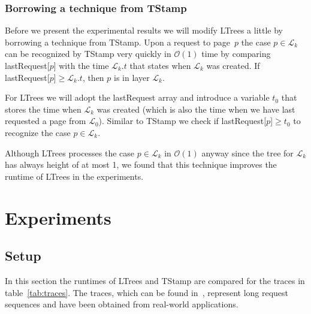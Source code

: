 \documentclass[a4paper,12pt, titlepage]{article}  %
\newcommand{\cl}{\mathcal{L}}   %
\newcommand{\oh}{\mathcal{O}}   %
\begin{document}
\subsubsection{Borrowing a technique from TStamp}
Before we present the experimental results we will modify LTrees a little by borrowing a technique
from TStamp. Upon a request to page~$p$ the case $p \in \cl_k$ can be recognized by TStamp very quickly in $\oh(1)$ time by
comparing lastRequest[$p$] with the time $\cl_k.t$ that states when 
$\cl_k$ was created. If lastRequest[$p$]$\geq \cl_k.t$, then $p$ is in layer $\cl_k$.

For LTrees we will adopt the lastRequest array and introduce a variable $t_0$ that stores 
the time when $\cl_k$ was created (which is also the time when we have last requested a page from $\cl_0$). 
Similar to TStamp we check if lastRequest[$p$]$\geq t_0$ to recognize the case $p \in \cl_k$. 

Although LTrees processes the case $p \in \cl_k$ in $\oh(1)$ anyway since the tree for $\cl_k$ 
has always height of at most 1, we found that this technique improves the runtime 
of LTrees in the experiments.

 

\newpage
\section{Experiments}

\subsection{Setup}

In this section the runtimes of LTrees and TStamp are compared for the traces in table~\ref{tab:traces}.
The traces, which can be found in~\cite{arc_paper}, represent long request sequences and have been 
obtained from real-world applications.
\end{document}
